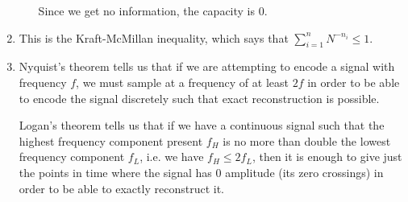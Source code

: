 \begin{enumerate}[label=(\alph*)]
\begin{enumerate}[label=(\roman*)]
        Since we get no information, the capacity is 0.

    \end{enumerate}

      \item
        This is the Kraft-McMillan inequality, which says that $\sum_{i=1}^n  N^{-n_i} \leq 1$.

      \item
        Nyquist's theorem tells us that if we are attempting to encode a signal with frequency $f$, we must sample at a frequency of at least $2f$ in order to be able to encode the signal discretely such that exact reconstruction is possible.

        Logan's theorem tells us that if we have a continuous signal such that the highest frequency component present $f_H$ is no more than double the lowest frequency component $f_L$, i.e. we have $f_H \leq 2f_L$, then it is enough to give just the points in time where the signal has 0 amplitude (its zero crossings) in order to be able to exactly reconstruct it. 


        
\end{enumerate}

